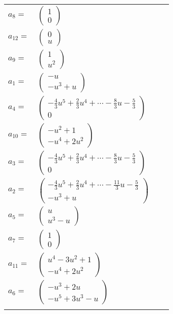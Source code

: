 \documentclass[1p]{elsarticle_modified}
\theoremstyle{definition}
\begin{document}
\begin{tabular}{m{7pt} m{180pt} m{7pt} m{180pt} }
\flushright $a_{8}=$&$\begin{pmatrix}1\\0\end{pmatrix}$ \\
\flushright $a_{12}=$&$\begin{pmatrix}0\\u\end{pmatrix}$ \\
\flushright $a_{9}=$&$\begin{pmatrix}1\\u^2\end{pmatrix}$ \\
\flushright $a_{1}=$&$\begin{pmatrix}- u\\- u^3+u\end{pmatrix}$ \\
\flushright $a_{4}=$&$\begin{pmatrix}-\frac{4}{3} u^5+\frac{2}{3} u^4+\cdots-\frac{8}{3} u-\frac{5}{3}\\0\end{pmatrix}$ \\
\flushright $a_{10}=$&$\begin{pmatrix}- u^2+1\\- u^4+2 u^2\end{pmatrix}$ \\
\flushright $a_{3}=$&$\begin{pmatrix}-\frac{4}{3} u^5+\frac{2}{3} u^4+\cdots-\frac{8}{3} u-\frac{5}{3}\\0\end{pmatrix}$ \\
\flushright $a_{2}=$&$\begin{pmatrix}-\frac{4}{3} u^5+\frac{2}{3} u^4+\cdots-\frac{11}{3} u-\frac{5}{3}\\- u^3+u\end{pmatrix}$ \\
\flushright $a_{5}=$&$\begin{pmatrix}u\\u^3- u\end{pmatrix}$ \\
\flushright $a_{7}=$&$\begin{pmatrix}1\\0\end{pmatrix}$ \\
\flushright $a_{11}=$&$\begin{pmatrix}u^4-3 u^2+1\\- u^4+2 u^2\end{pmatrix}$ \\
\flushright $a_{6}=$&$\begin{pmatrix}- u^3+2 u\\- u^5+3 u^3- u\end{pmatrix}$\\&\end{tabular}
\end{document}
